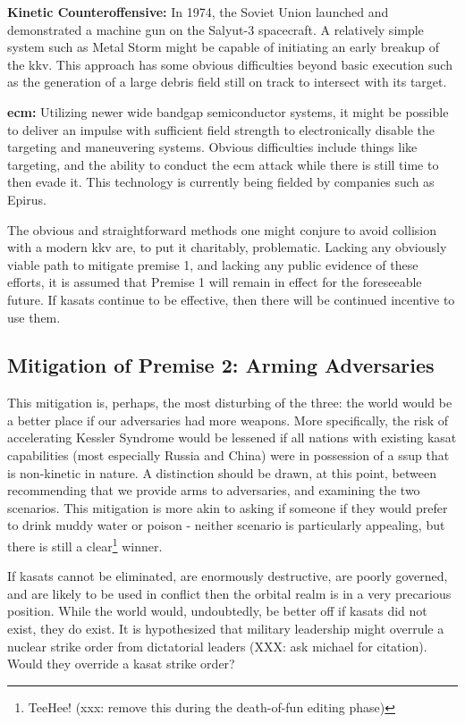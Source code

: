 \textbf{Kinetic Counteroffensive:} In 1974, the Soviet Union launched
and demonstrated a machine gun on the Salyut-3 spacecraft.\cite{xxx} A
relatively simple system such as Metal Storm might be capable of
initiating an early breakup of the \ac{kkv}.  This approach has some
obvious difficulties beyond basic execution such as the generation of
a large debris field still on track to intersect with its target.

\textbf{\acl{ecm}:} Utilizing newer wide bandgap semiconductor
systems, it might be possible to deliver an impulse with sufficient
field strength to electronically disable the  targeting and
maneuvering systems.  Obvious difficulties include things like
targeting, and the ability to conduct the \ac{ecm} attack while there
is still time to then evade it.  This technology is currently being
fielded by companies such as Epirus.\cite{epirus}

The obvious and straightforward methods one might conjure to avoid
collision with a modern \ac{kkv} are, to put it charitably,
problematic.  Lacking any obviously viable path to mitigate premise 1,
and lacking any public evidence of these efforts, it is assumed that
Premise 1 will remain in effect for the foreseeable future.  If
\acp{kasat} continue to be effective, then there will be continued
incentive to use them.

\subsection{Mitigation of Premise 2: Arming Adversaries}
This mitigation is, perhaps, the most disturbing of the three: the
world would be a better place if our adversaries had more weapons.
More specifically, the risk of accelerating Kessler Syndrome would be
lessened if all nations with existing \ac{kasat} capabilities (most
especially Russia and China) were in possession of a \acf{ssup} that
is non-kinetic in nature.  A distinction should be drawn, at this
point, between recommending that we provide arms to adversaries, and
examining the two scenarios.  This mitigation is more akin to asking
if someone if they would prefer to drink muddy water or poison -
neither scenario is particularly appealing, but there is still a
clear\footnote{TeeHee! (xxx: remove this during the death-of-fun
editing phase)} winner.

If \acp{kasat} cannot be eliminated, are enormously destructive, are
poorly governed, and are likely to be used in conflict then the
orbital realm is in a very precarious position.  While the world
would, undoubtedly, be better off if \acp{kasat} did not exist, they
do exist.  It is hypothesized that military leadership might overrule
a nuclear strike order from dictatorial leaders (XXX: ask michael for
citation).  Would they override a \ac{kasat} strike order?

